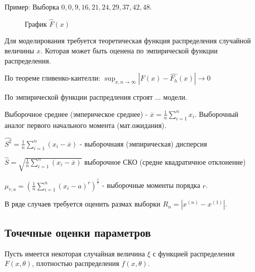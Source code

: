 \documentclass[12pt,a4paper,oneside]{extarticle}
\begin{document}
    Пример: Выборка ${0,0,9,16,21,24,29,37,42,48}$.
    
    \begin{figure}[h!]        
    \centering
    \caption{График $\hat{F}(x)$}
    \end{figure}


    Для моделирования требуется теоретическая функция распределения случайной величины $x$. Которая может быть оценена по эмпирической функции распределения.

    По теореме гливенко-кантелли: $\sup_{x,n\rightarrow \infty}|F(x)-\hat{F_h}(x)| \rightarrow 0$

    По эмпирической функции распредления строят ... модели.

    Выборочное среднее (эмперическое среднее) - $\overline{x}=\frac{1}{n} \sum_{i=1}^{n}x_i$. Выборочный аналог первого начального момента (мат.ожидания).

    $\hat{S^2}=\frac{1}{n} \sum_{i=1}^{n}(x_i-\overline{x})$ - выборочнаяя (эмпирическая) дисперсия

    $\hat{S}=\sqrt{\frac{1}{n} \sum_{i=1}^{n}(x_i-\overline{x})}$ выборочное СКО (средне квадратичное отклонение)

    $\mu_{r,a}=(\frac{1}{n} \sum_{i=1}^{n}(x_i-a)^r)^\frac{1}{r}$ - выборочные моменты порядка $r$.

    В ряде случаев требуется оценить размах выборки $R_n=|x^{(n)} - x^{(1)}|$.

    \subsection{Точечные оценки параметров}
        Пусть имеется некоторая случайная величина $\xi$ с функцией распределения $F(x,\theta)$, плотностью распределения $f(x, \theta)$.
\end{document}
